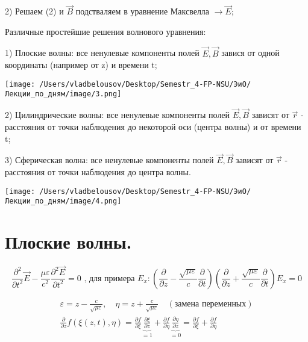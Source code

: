 \documentclass[12pt, a4paper]{report}
\begin{document}
2) Решаем (2) и \( \vec{B} \)  подстваляем в уравнение Максвелла \( \to  \vec{E} \);

Различные простейшие решения волнового уравнения: 

1) Плоские волны: все ненулевые компоненты полей \( \vec{ E} ,\vec{ B} \) завися от одной координаты (например от z)  и времени t; 

\begin{center}
    \texttt{[image: /Users/vladbelousov/Desktop/Semestr\_4-FP-NSU/ЭиО/Лекции\_по\_дням/image/3.png]}
\end{center}


2) Цилиндрические волны: все ненулевые компоненты полей \( \vec{ E} ,\vec{ B} \) зависят от \( \vec{ r}  \)  - расстояния от точки наблюдения до некоторой оси (центра волны) и от времени t; 

3) Сферическая волна: все ненулевые компоненты полей \( \vec{ E} ,\vec{ B} \) зависят от \( \vec{r}  \)  - расстояния от точки наблюдения до центра волны.

\begin{center}
    \texttt{[image: /Users/vladbelousov/Desktop/Semestr\_4-FP-NSU/ЭиО/Лекции\_по\_дням/image/4.png]}
\end{center}

\section{Плоские волны. }

\[ \frac{\partial ^2 }{\partial t^2 } \vec{E} - \frac{\mu \varepsilon}{c ^2} \frac{\partial ^2 \vec{ E}}{\partial t ^2 } =0 \text{ , для примера }  E_x : \left( \frac{\partial}{\partial z} - \frac{\sqrt{\mu \varepsilon} }{c} \frac{\partial}{\partial t }   \right) \left( \frac{\partial}{\partial z} + \frac{\sqrt{\mu \varepsilon} }{c} \frac{\partial}{\partial t } \right) E_x = 0    \] 

\begin{gather*}
    \varepsilon = z - \frac{c}{ \sqrt{\mu \varepsilon} }, \quad \eta = z + \frac{c}{ \sqrt{\mu \varepsilon} } \quad ( \text{замена переменных} )  \\
    \frac{\partial}{\partial z } f ( \xi ( z,t), \eta ) = \frac{\partial f}{\partial \xi }  \underbrace{\frac{\partial \xi }{\partial z }}_{=1} + \frac{\partial f }{\partial \eta  }   \underbrace{\frac{\partial \eta }{\partial z }}_{=0}= \frac{\partial f}{\partial \xi } + \frac{\partial f}{ \partial \eta } \\
\end{gather*}
\end{document}
